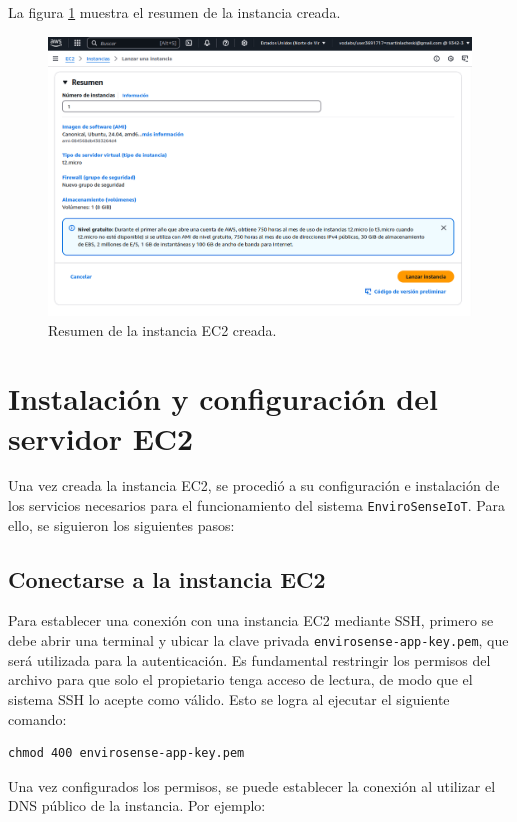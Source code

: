 La figura \ref{fig:aws-ec2} muestra el resumen de la instancia creada.
\begin{figure}[H]
    \centering
    \includegraphics[width=\textwidth]{./Images/32-ec2-1.png}
    \caption{Resumen de la instancia EC2 creada.}
    \label{fig:aws-ec2}
\end{figure}

\section{Instalación y configuración del servidor EC2}

Una vez creada la instancia EC2, se procedió a su configuración e instalación
de los servicios necesarios para el funcionamiento del sistema
\texttt{EnviroSenseIoT}. Para ello, se siguieron los siguientes pasos:

\subsection{Conectarse a la instancia EC2}
Para establecer una conexión con una instancia EC2 mediante SSH, primero se
debe abrir una terminal y ubicar la clave privada
\texttt{envirosense-app-key.pem}, que será utilizada para la autenticación. Es
fundamental restringir los permisos del archivo para que solo el propietario
tenga acceso de lectura, de modo que el sistema SSH lo acepte como válido. Esto
se logra al ejecutar el siguiente comando:

\begin{verbatim}
chmod 400 envirosense-app-key.pem
\end{verbatim}

Una vez configurados los permisos, se puede establecer la conexión al utilizar
el DNS público de la instancia. Por ejemplo:


